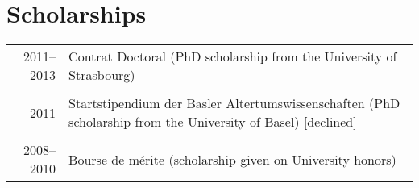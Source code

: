 \section{Scholarships}
\begin{tabular}{r|l}
\textsc{2011--2013} & Contrat Doctoral (PhD scholarship from the University of Strasbourg)\\
\multicolumn{2}{c}{} \\
\textsc{2011}  & Startstipendium der Basler Altertumswissenschaften (PhD scholarship from the University of Basel) [declined] \\
\multicolumn{2}{c}{} \\
\textsc{2008--2010}  & Bourse de mérite (scholarship given on University honors) \\
\end{tabular}
